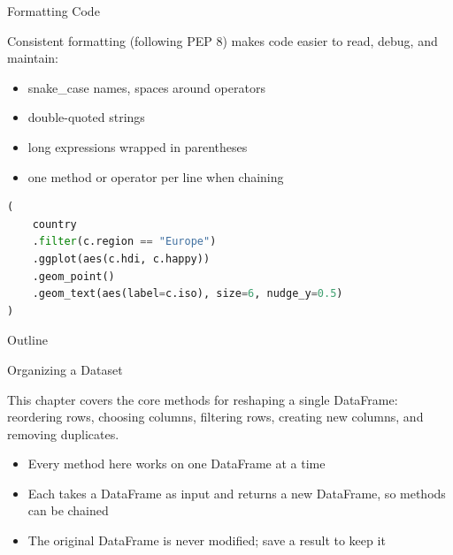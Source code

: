 \documentclass[8pt,aspectratio=169]{beamer}
\begin{document}
\begin{frame}[fragile]{Formatting Code}
\begin{splitcode}{%

Consistent formatting (following PEP 8) makes code easier to read, debug, and maintain:

\begin{itemize}
\item snake\_case names, spaces around operators
\item double-quoted strings
\item long expressions wrapped in parentheses
\item one method or operator per line when chaining
\end{itemize}

}
\begin{lstlisting}[language=Python]
(
    country
    .filter(c.region == "Europe")
    .ggplot(aes(c.hdi, c.happy))
    .geom_point()
    .geom_text(aes(label=c.iso), size=6, nudge_y=0.5)
)
\end{lstlisting}
\end{splitcode}
\end{frame}

\begin{outlineframe}{Outline}
\end{outlineframe}

\begin{textframe}{Organizing a Dataset}

This chapter covers the core methods for reshaping a single DataFrame: reordering rows, choosing columns, filtering rows, creating new columns, and removing duplicates.

\begin{itemize}
\item Every method here works on one DataFrame at a time
\item Each takes a DataFrame as input and returns a new DataFrame, so methods can be chained
\item The original DataFrame is never modified; save a result to keep it
\end{itemize}

\end{textframe}
\end{document}
